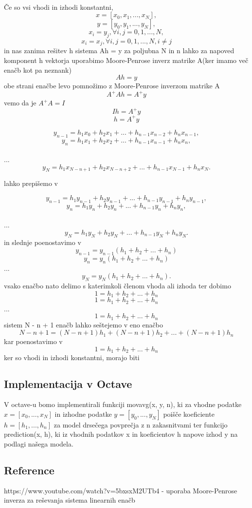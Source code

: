 \documentclass[A4]{article}
\begin{document}
\\[0.3in] Če so vsi vhodi in izhodi konstantni, 
\[
	x = [x_{0},x_{1},...,x_{N}], 
\]
\[
	y = [y_{0},y_{1},...,y_{N}],
\]
\[
	x_{i} = y_{j}, { \forall i,j = 0, 1, ..., N }, 
\]
\[
	x_{i} = x_{j}, { \forall i,j = 0, 1, ..., N }, i \neq j
\]
in nas zanima rešitev h sistema Ah = y  za poljubna N in n lahko za napoved komponent h vektorja uporabimo Moore-Penrose inverz matrike A(ker imamo več enačb kot pa neznank) 
\[
Ah = y
\] 
obe strani enačbe levo pomnožimo z Moore-Penrose inverzom matrike A
\[
A^{+}A h = A^{+}y
\]
vemo da je $A^{+}A = I$
\[ 
Ih = A^{+}y
\]
\[
h = A^{+}y
\]
{\centering
\[ 
y_{n - 1} = h_{1} x_{0} + h_{2} x_{1} + ... + h_{n - 1}x_{n - 2} + h_{n}x_{n - 1}, 
\]
\[
y_{n} = h_{1} x_{1} + h_{2} x_{2} + ... + h_{n - 1}x_{n - 1} + h_{n}x_{n}, 
\]
\\ ...
\[ y_{N} = h_{1} x_{N - n + 1} + h_{2} x_{N - n + 2} + ... + h_{n - 1}x_{N - 1} + h_{n}x_{N}. 
\] \par }
lahko prepišemo v 
{\centering
\[ 
y_{n - 1} = h_{1}y_{n-1} + h_{2}y_{n-1} + ... + h_{n - 1}y_{n-1} + h_{n}y_{n - 1}, 
\]
\[
y_{n} = h_{1}y_{n} + h_{2}y_{n} + ... + h_{n - 1}y_{n} + h_{n}y_{n}, 
\]
\\ ...
\[ y_{N} = h_{1} y_{N} + h_{2} y_{N} + ... + h_{n - 1}y_{N} + h_{n}y_{N}. 
\] 
in slednje poenostavimo v 
\[ 
y_{n - 1} = y_{n - 1} (h_{1} + h_{2} + ... + h_{n})  
\]
\[
y_{n} = y_{n} (h_{1} + h_{2} + ... + h_{n})  
\]
...
\[
y_{N} = y_{N} (h_{1} + h_{2} + ... + h_{n}) .
\]
vsako enačbo nato delimo s katerimkoli členom vhoda ali izhoda ter dobimo 
\[ 
1 = h_{1} + h_{2} + ... + h_{n}   
\]
\[
1 = h_{1} + h_{2} + ... + h_{n}  
\]
...
\[
1 = h_{1} + h_{2} + ... + h_{n} 
\] 
sistem N - n + 1 enačb lahko seštejemo v eno enačbo 
\[ 
N - n + 1 = (N - n + 1)h_{1} + (N - n + 1)h_{2} + ... + (N - n + 1)h_{n}
\]
kar poenostavimo v 
\[
1 = h_{1} + h_{2} + ... + h_{n} 
\]
ker so vhodi in izhodi konstantni, morajo biti  
\par }

\subsection {Implementacija v Octave}
V octave-u bomo implementirali funkciji movavg(x, y, n), ki za vhodne podatke $x = [x_{0}, ... , x_{N}]$ in izhodne podatke $y = [y_{0}, ... , y_{N}]$ poišče koeficiente $h = [h_{1}, ..., h_{n}]$ za model drsečega povprečja z n zakasnitvami ter funkcijo prediction(x, h), ki iz vhodnih podatkov x in koeficientov h napove izhod y na podlagi našega modela.
\subsection {Reference} 
https://www.youtube.com/watch?v=5bxsxM2UTb4 - uporaba Moore-Penrose inverza za reševanja sistema linearnih enačb
\end{document}
